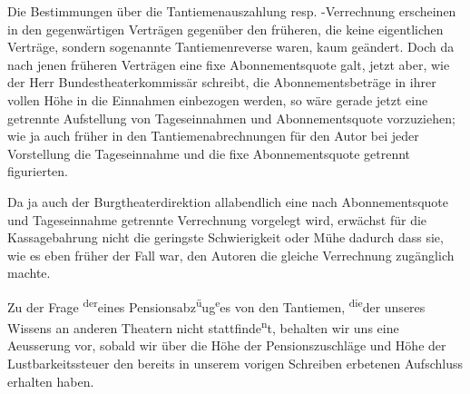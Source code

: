 \pstart
           Die Bestimmungen über die Tantiemenauszahlung resp. -Verrechnung erscheinen in den
               gegenwärtigen Verträgen gegenüber den früheren, die keine eigentlichen Verträge,
               sondern sogenannte Tantiemenreverse waren, kaum geändert. Doch da nach jenen früheren
               Verträgen eine fixe Abonnementsquote galt, jetzt aber, wie der Herr Bundestheaterkommissär schreibt, die
               Abonnementsbeträge in ihrer vollen Höhe in die Einnahmen einbezogen werden, so wäre
               gerade jetzt eine getrennte Aufstellung von Tageseinnahmen und Abonnementsquote
               vorzuziehen; wie ja auch früher in den Tantiemenabrechnungen für den Autor bei jeder
               Vorstellung die Tageseinnahme und die fixe Abonnementsquote getrennt figurierten.\pend
           
\pstart
           Da ja auch der Burgtheaterdirektion allabendlich
               eine nach Abonnementsquote und Tageseinnahme getrennte Verrechnung vorgelegt wird,
               erwächst für die Kassagebahrung nicht die geringste Schwierigkeit oder Mühe dadurch
               dass sie, wie es eben früher der Fall war, den Autoren die gleiche Verrechnung zu{\pb}gänglich machte.\pend
           
\pstart
           Zu der Frage \substVorne{}\textsuperscript{der}\substDazwischen{}eines\substHinten{} Pensionsabz\substVorne{}\textsuperscript{ü}\substDazwischen{}u\substHinten{}g\substVorne{}\textsuperscript{e}\substDazwischen{}es\substHinten{} von den Tantiemen, \substVorne{}\textsuperscript{die}\substDazwischen{}der\substHinten{} unseres Wissens an anderen Theatern  nicht stattfinde\substVorne{}\textsuperscript{n}\substDazwischen{}t\substHinten{}, behalten wir uns eine Aeusserung vor, sobald wir über die Höhe der
               Pensionszuschläge und Höhe der Lustbarkeitssteuer den bereits in unserem vorigen
               Schreiben erbetenen Aufschluss erhalten haben.\pend
           \endnumbering{}  
      